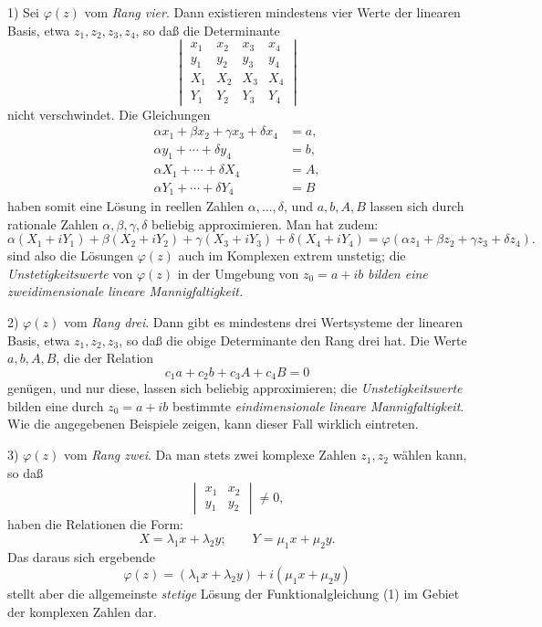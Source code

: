 \documentclass[11pt]{article}
\begin{document}
1) Sei \(\varphi(z)\) vom \emph{Rang vier}. Dann existieren mindestens vier Werte der linearen Basis, etwa \(z_1,z_2,z_3,z_4\), so daß die Determinante
\[
\begin{vmatrix}
x_1&x_2&x_3&x_4\\
y_1&y_2&y_3&y_4\\
X_1&X_2&X_3&X_4\\
Y_1&Y_2&Y_3&Y_4
\end{vmatrix}
\]
nicht verschwindet. Die Gleichungen
\[
\begin{aligned}
\alpha x_1+\beta x_2+\gamma x_3+\delta x_4&=a,\\
\alpha y_1+\cdots+\delta y_4&=b,\\
\alpha X_1+\cdots+\delta X_4&=A,\\
\alpha Y_1+\cdots+\delta Y_4&=B
\end{aligned}
\]
haben somit eine Lösung in reellen Zahlen \(\alpha,\ldots,\delta\), und \(a,b,A,B\) lassen sich durch rationale Zahlen \(\alpha,\beta,\gamma,\delta\) beliebig approximieren. Man hat zudem:
\[
\alpha(X_1+iY_1)+\beta(X_2+iY_2)+\gamma(X_3+iY_3)+\delta(X_4+iY_4)
 =\varphi(\alpha z_1+\beta z_2+\gamma z_3+\delta z_4).
\]
 sind also die Lösungen \(\varphi(z)\) auch im Komplexen extrem unstetig; die \emph{Unstetigkeitswerte} von \(\varphi(z)\) in der Umgebung von \(z_0=a+ib\) \emph{bilden eine zweidimensionale lineare Mannigfaltigkeit.}

2) \(\varphi(z)\) vom \emph{Rang drei}. Dann gibt es mindestens drei Wertsysteme der linearen Basis, etwa \(z_1,z_2,z_3\), so daß die obige Determinante den Rang drei hat. Die Werte \(a,b,A,B\), die der Relation
\[
c_1a+c_2b+c_3A+c_4B=0
\]
genügen, und nur diese, lassen sich beliebig approximieren; die \emph{Unstetigkeitswerte} bilden eine durch \(z_0=a+ib\) bestimmte \emph{eindimensionale lineare Mannigfaltigkeit}. Wie die angegebenen Beispiele zeigen, kann dieser Fall wirklich eintreten.

3) \(\varphi(z)\) vom \emph{Rang zwei}. Da man stets zwei komplexe Zahlen \(z_1,z_2\) wählen kann, so daß
\[
\begin{vmatrix}x_1&x_2\\ y_1&y_2\end{vmatrix}\ne0,
\]
haben die Relationen die Form:
\[
X=\lambda_1x+\lambda_2y;\qquad Y=\mu_1x+\mu_2y.
\]
Das daraus sich ergebende
\[
\varphi(z)=(\lambda_1x+\lambda_2y)+i(\mu_1x+\mu_2y)
\]
stellt aber die allgemeinste \emph{stetige} Lösung der Funktionalgleichung (1) im Gebiet der komplexen Zahlen dar.
\end{document}
